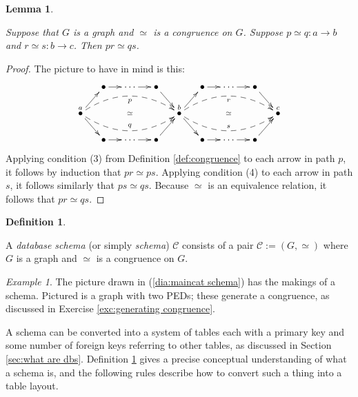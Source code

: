 \documentclass{book}
\def\mc{\mathcal}
\def\to{\rightarrow}
\def\taking{\colon}
\newcommand{\LMO}[1]{\stackrel{#1}{\bullet}}
\def\mcC{\mc{C}}
\newtheorem{lemma}[subsubsection]{Lemma}
\theoremstyle{remark}
\newtheorem{example}[subsubsection]{Example}
\theoremstyle{definition}
\newtheorem{definition}[subsubsection]{Definition}
\begin{document}
\begin{lemma}\label{lemma:composing PEDs}

Suppose that $G$ is a graph and $\simeq$ is a congruence on $G$. Suppose $p\simeq q\taking a\to b$ and $r\simeq s\taking b\to c$. Then $pr\simeq qs$.

\end{lemma}

\begin{proof}

The picture to have in mind is this: $$\xymatrix@=13pt{&\bullet\ar[r]&\cdots\ar[r]&\bullet\ar[dr]&&\bullet\ar[r]&\cdots\ar[r]&\bullet\ar[dr]\\\LMO{a}\ar@{}[rrrr]|{\simeq}\ar[ur]\ar[dr]\ar@{-->}@/^1.5pc/[rrrr]_p\ar@{-->}@/_1.5pc/[rrrr]^q&&&&\LMO{b}\ar@{}[rrrr]|{\simeq}\ar[ur]\ar[dr]\ar@{-->}@/^1.5pc/[rrrr]_r\ar@{-->}@/_1.5pc/[rrrr]^s&&&&\LMO{c}\\&\bullet\ar[r]&\cdots\ar[r]&\bullet\ar[ur]&&\bullet\ar[r]&\cdots\ar[r]&\bullet\ar[ur]}$$ Applying condition (3) from Definition \ref{def:congruence} to each arrow in path $p$, it follows by induction that $pr\simeq ps$. Applying condition (4) to each arrow in path $s$, it follows similarly that $ps\simeq qs$. Because $\simeq$ is an equivalence relation, it follows that $pr\simeq qs$. 

\end{proof}

\begin{definition}\label{def:schema}

A {\em database schema} (or simply {\em schema}) $\mcC$ consists of a pair $\mcC:=(G,\simeq)$ where $G$ is a graph and $\simeq$ is a congruence on $G$. 

\end{definition}

\begin{example}

The picture drawn in (\ref{dia:maincat schema}) has the makings of a schema. Pictured is a graph with two PEDs; these generate a congruence, as discussed in Exercise \ref{exc:generating congruence}.  

\end{example}

A schema can be converted into a system of tables each with a primary key and some number of foreign keys referring to other tables, as discussed in Section \ref{sec:what are dbs}. Definition \ref{def:schema} gives a precise conceptual understanding of what a schema is, and the following rules describe how to convert such a thing into a table layout.
\end{document}
